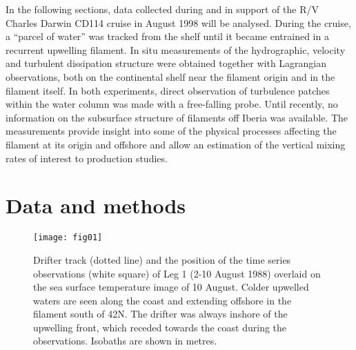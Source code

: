 In the following sections, data collected during and in support of
the R/V Charles Darwin CD114 cruise in August 1998 will be
analysed. During the cruise, a ``parcel of water'' was tracked
from the shelf until it became entrained in a recurrent upwelling
filament. In situ measurements of the hydrographic, velocity and
turbulent dissipation structure were obtained together with
Lagrangian observations, both on the continental shelf near the
filament origin and in the filament itself. In both experiments,
direct observation of turbulence patches within the water column
was made with a free-falling probe. Until recently, no information
on the subsurface structure of filaments off Iberia was available.
The measurements provide insight into some of the physical
processes affecting the filament at its origin and offshore and
allow an estimation of the vertical mixing rates of interest to
production studies.
\section{Data and methods}
\begin{figure}
\centering %
\texttt{[image: fig01]}%
\caption{Drifter track (dotted line) and the position of the time
series observations (white square) of Leg 1 (2-10 August 1988)
overlaid on the sea surface temperature image of 10 August. Colder
upwelled waters are seen along the coast and extending offshore in
the filament south of 42\deg N. The drifter was always inshore of
the upwelling front, which receded towards
the coast during the observations. Isobaths are shown in metres.}%
\label{fig:cd114leg1}%
\end{figure}

